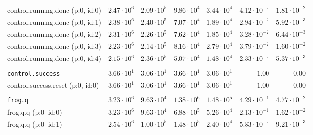 \begin{table}[htbp]
{\begin{tabular}{lrrrrrr}
\hspace{3mm}control.running.done (p:0, id:0)  & $2.47 \cdot 10^{6}$ & $2.09 \cdot 10^{5}$ & $9.86 \cdot 10^{4}$ & $3.44 \cdot 10^{4}$ & $4.12 \cdot 10^{-2}$ & $1.81 \cdot 10^{-2}$ \\
\hspace{3mm}control.running.done (p:0, id:1)  & $2.38 \cdot 10^{6}$ & $2.40 \cdot 10^{5}$ & $7.07 \cdot 10^{4}$ & $1.89 \cdot 10^{4}$ & $2.94 \cdot 10^{-2}$ & $5.92 \cdot 10^{-3}$ \\
\hspace{3mm}control.running.done (p:0, id:2)  & $2.31 \cdot 10^{6}$ & $2.26 \cdot 10^{5}$ & $7.62 \cdot 10^{4}$ & $1.85 \cdot 10^{4}$ & $3.28 \cdot 10^{-2}$ & $6.44 \cdot 10^{-3}$ \\
\hspace{3mm}control.running.done (p:0, id:3)  & $2.23 \cdot 10^{6}$ & $2.14 \cdot 10^{5}$ & $8.16 \cdot 10^{4}$ & $2.79 \cdot 10^{4}$ & $3.79 \cdot 10^{-2}$ & $1.60 \cdot 10^{-2}$ \\
\hspace{3mm}control.running.done (p:0, id:4)  & $2.15 \cdot 10^{6}$ & $2.36 \cdot 10^{5}$ & $5.07 \cdot 10^{4}$ & $1.48 \cdot 10^{4}$ & $2.33 \cdot 10^{-2}$ & $5.37 \cdot 10^{-3}$ \\
\\[-8pt]\texttt{control.success}              & $3.66 \cdot 10^{1}$ & $3.06 \cdot 10^{1}$ & $3.66 \cdot 10^{1}$ & $3.06 \cdot 10^{1}$ &               $1.00$ &               $0.00$ \\
\hspace{3mm}control.success.reset (p:0, id:0) & $3.66 \cdot 10^{1}$ & $3.06 \cdot 10^{1}$ & $3.66 \cdot 10^{1}$ & $3.06 \cdot 10^{1}$ &               $1.00$ &               $0.00$ \\
\\[-8pt]\texttt{frog.q}                       & $3.23 \cdot 10^{6}$ & $9.63 \cdot 10^{4}$ & $1.38 \cdot 10^{6}$ & $1.48 \cdot 10^{5}$ & $4.29 \cdot 10^{-1}$ & $4.77 \cdot 10^{-2}$ \\
\hspace{3mm}frog.q.q (p:0, id:0)              & $3.23 \cdot 10^{6}$ & $9.63 \cdot 10^{4}$ & $6.88 \cdot 10^{5}$ & $5.26 \cdot 10^{4}$ & $2.13 \cdot 10^{-1}$ & $1.62 \cdot 10^{-2}$ \\
\hspace{3mm}frog.q.q (p:0, id:1)              & $2.54 \cdot 10^{6}$ & $1.00 \cdot 10^{5}$ & $1.48 \cdot 10^{5}$ & $2.40 \cdot 10^{4}$ & $5.83 \cdot 10^{-2}$ & $9.21 \cdot 10^{-3}$ \\

\end{tabular}}
\end{table}
